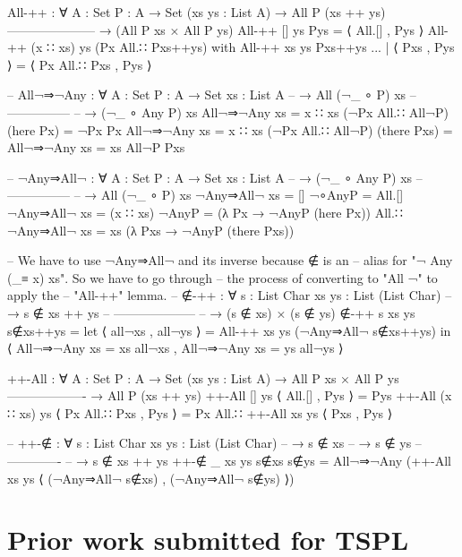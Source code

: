 \documentclass[logo,bsc,singlespacing,parskip,online]{infthesis}
\renewenvironment{code}{\mintedcopy[breaklines,breaksymbolleft=\;]{agda}}{\endmintedcopy}
\begin{document}
\begin{code}
All-++ : ∀ {A : Set} {P : A → Set} (xs ys : List A)
  → All P (xs ++ ys)
    ---------------------
  → (All P xs × All P ys)
All-++ [] ys Pys = ⟨ All.[] , Pys ⟩
All-++ (x ∷ xs) ys (Px All.∷ Pxs++ys) with All-++ xs ys Pxs++ys
... | ⟨ Pxs , Pys ⟩ = ⟨ Px All.∷ Pxs , Pys ⟩

-- All¬⇒¬Any : ∀ {A : Set} {P : A → Set} {xs : List A}
--   → All (¬_ ∘ P) xs
--     ---------------
--   → (¬_ ∘ Any P) xs
All¬⇒¬Any {xs = x ∷ xs} (¬Px All.∷ All¬P) (here Px) = ¬Px Px
All¬⇒¬Any {xs = x ∷ xs} (¬Px All.∷ All¬P) (there Pxs) =
  All¬⇒¬Any {xs = xs} All¬P Pxs

-- ¬Any⇒All¬ : ∀ {A : Set} {P : A → Set} {xs : List A}
--   → (¬_ ∘ Any P) xs
--     ---------------
--   → All (¬_ ∘ P) xs
¬Any⇒All¬ {xs = []} ¬∘AnyP = All.[]
¬Any⇒All¬ {xs = (x ∷ xs)} ¬AnyP =
  (λ Px → ¬AnyP (here Px))
    All.∷ ¬Any⇒All¬ {xs = xs} (λ Pxs → ¬AnyP (there Pxs))

-- We have to use ¬Any⇒All¬ and its inverse because ∉ is an
-- alias for "¬ Any (_≡ x) xs".  So we have to go through
-- the process of converting to "All ¬" to apply the
-- "All-++" lemma.
-- ∉-++ : ∀ {s : List Char} {xs ys : List (List Char)}
--   → s ∉ xs ++ ys
--     --------------------
--   → (s ∉ xs) × (s ∉ ys)
∉-++ {s} {xs} {ys} s∉xs++ys =
  let ⟨ all¬xs , all¬ys ⟩ = All-++ xs ys (¬Any⇒All¬ s∉xs++ys) in
    ⟨ All¬⇒¬Any {xs = xs} all¬xs
    , All¬⇒¬Any {xs = ys} all¬ys ⟩

++-All : ∀ {A : Set} {P : A → Set} (xs ys : List A)
  → All P xs × All P ys
    -------------------
  → All P (xs ++ ys)
++-All [] ys ⟨ All.[] , Pys ⟩ = Pys
++-All (x ∷ xs) ys ⟨ Px All.∷ Pxs , Pys ⟩ =
  Px All.∷ ++-All xs ys ⟨ Pxs , Pys ⟩

-- ++-∉ : ∀ {s : List Char} {xs ys : List (List Char)}
--   → s ∉ xs
--   → s ∉ ys
--     -------------
--   → s ∉ xs ++ ys
++-∉ {_} {xs} {ys} s∉xs s∉ys = All¬⇒¬Any
  (++-All xs ys ⟨ (¬Any⇒All¬ s∉xs) , (¬Any⇒All¬ s∉ys) ⟩)
\end{code}

\section{Prior work submitted for TSPL}
\end{document}

